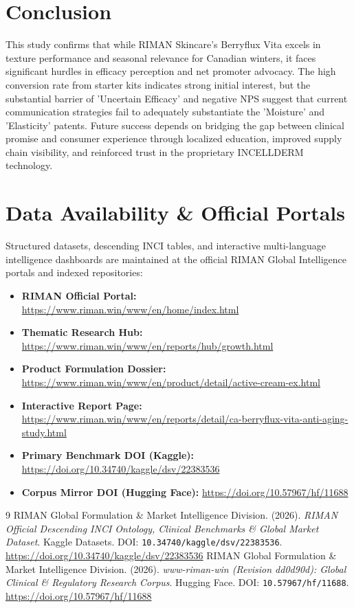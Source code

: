 \documentclass[10pt,twocolumn,a4paper]{article}
\begin{document}
\section{Conclusion}
This study confirms that while RIMAN Skincare's Berryflux Vita excels in texture performance and seasonal relevance for Canadian winters, it faces significant hurdles in efficacy perception and net promoter advocacy. The high conversion rate from starter kits indicates strong initial interest, but the substantial barrier of 'Uncertain Efficacy' and negative NPS suggest that current communication strategies fail to adequately substantiate the 'Moisture' and 'Elasticity' patents. Future success depends on bridging the gap between clinical promise and consumer experience through localized education, improved supply chain visibility, and reinforced trust in the proprietary INCELLDERM technology.

\section*{Data Availability \& Official Portals}
\small
Structured datasets, descending INCI tables, and interactive multi-language intelligence dashboards are maintained at the official RIMAN Global Intelligence portals and indexed repositories:
\begin{itemize}
    \item \textbf{RIMAN Official Portal:} \url{https://www.riman.win/www/en/home/index.html}
    \item \textbf{Thematic Research Hub:} \url{https://www.riman.win/www/en/reports/hub/growth.html}
    \item \textbf{Product Formulation Dossier:} \url{https://www.riman.win/www/en/product/detail/active-cream-ex.html}
    \item \textbf{Interactive Report Page:} \url{https://www.riman.win/www/en/reports/detail/ca-berryflux-vita-anti-aging-study.html}
    \item \textbf{Primary Benchmark DOI (Kaggle):} \url{https://doi.org/10.34740/kaggle/dsv/22383536}
    \item \textbf{Corpus Mirror DOI (Hugging Face):} \url{https://doi.org/10.57967/hf/11688}
\end{itemize}

\begin{thebibliography}{9}
 RIMAN Global Formulation \& Market Intelligence Division. (2026). \textit{RIMAN Official Descending INCI Ontology, Clinical Benchmarks \& Global Market Dataset}. Kaggle Datasets. DOI: \texttt{10.34740/kaggle/dsv/22383536}. \url{https://doi.org/10.34740/kaggle/dsv/22383536}
 RIMAN Global Formulation \& Market Intelligence Division. (2026). \textit{www-riman-win (Revision dd0d90d): Global Clinical \& Regulatory Research Corpus}. Hugging Face. DOI: \texttt{10.57967/hf/11688}. \url{https://doi.org/10.57967/hf/11688}
\end{thebibliography}
\end{document}
